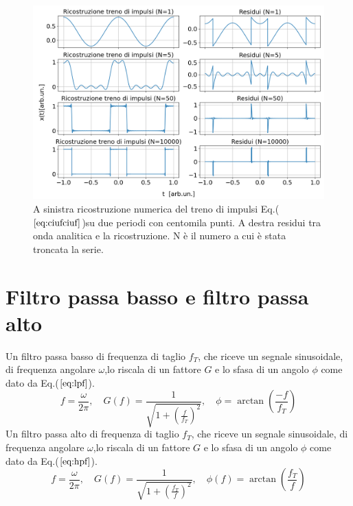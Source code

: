 \documentclass{article}
\begin{document}
    \begin{figure}[H]
        \centering
        \includegraphics[width=1\textwidth]{foupulsetrainwave1e5.png} %
        \caption{A sinistra ricostruzione numerica del treno di impulsi
        Eq.($\ref{eq:ciufciuf}$)su due periodi con centomila punti.
        A destra residui tra onda analitica e la ricostruzione.
        N è il numero a cui è stata troncata la serie. }
        \label{fig:ciufciuf2}
    \end{figure}



\section{Filtro passa basso e filtro passa alto}
    \label{sez:filt}
    Un filtro passa basso di frequenza di taglio $f_T$, che riceve un segnale sinusoidale, di 
    frequenza angolare $\omega$,lo riscala di un fattore $G$ e lo sfasa di un 
    angolo $\phi$ come dato da Eq.($\ref{eq:lpf}$).
        \begin{equation}
            f = \frac{\omega}{2\pi}, \quad 
            G(f) = \frac{1}{\sqrt{1 + \left(\frac{f}{f_T}\right)^2}}, \quad 
            \phi = \arctan\left(\frac{-f}{f_T}\right)
            \label{eq:lpf}
        \end{equation}
    Un filtro passa alto di frequenza di taglio $f_T$, che riceve un segnale sinusoidale, di 
    frequenza angolare $\omega$,lo riscala di un fattore $G$ e lo sfasa di un 
    angolo $\phi$ come dato da Eq.($\ref{eq:hpf}$).
        \begin{equation}
            f = \frac{\omega}{2\pi}, \quad 
            G(f) = \frac{1}{\sqrt{1 + \left(\frac{f_T}{f}\right)^2}}, \quad 
            \phi(f)= \arctan\left(\frac{f_T}{f}\right)
            \label{eq:hpf}
        \end{equation}
\end{document}
